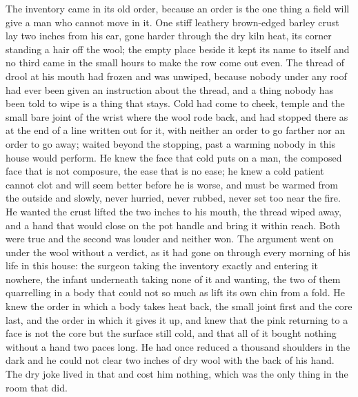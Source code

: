 The inventory came in its old order, because an order is the one thing a field will give a man who cannot move in it. One stiff leathery brown-edged barley crust lay two inches from his ear, gone harder through the dry kiln heat, its corner standing a hair off the wool; the empty place beside it kept its name to itself and no third came in the small hours to make the row come out even. The thread of drool at his mouth had frozen and was unwiped, because nobody under any roof had ever been given an instruction about the thread, and a thing nobody has been told to wipe is a thing that stays. Cold had come to cheek, temple and the small bare joint of the wrist where the wool rode back, and had stopped there as at the end of a line written out for it, with neither an order to go farther nor an order to go away;  waited beyond the stopping, past a warming nobody in this house would perform. He knew the face that cold puts on a man, the composed face that is not composure, the ease that is no ease; he knew a cold patient cannot clot and will seem better before he is worse, and must be warmed from the outside and slowly, never hurried, never rubbed, never set too near the fire. He wanted the crust lifted the two inches to his mouth, the thread wiped away, and a hand that would close on the pot handle and bring it within reach. Both were true and the second was louder and neither won. The argument went on under the wool without a verdict, as it had gone on through every morning of his life in this house: the surgeon taking the inventory exactly and entering it nowhere, the infant underneath taking none of it and wanting, the two of them quarrelling in a body that could not so much as lift its own chin from a fold. He knew the order in which a body takes heat back, the small joint first and the core last, and the order in which it gives it up, and knew that the pink returning to a face is not the core but the surface still cold, and that all of it bought nothing without a hand two paces long. He had once reduced a thousand shoulders in the dark and he could not clear two inches of dry wool with the back of his hand. The dry joke lived in that and cost him nothing, which was the only thing in the room that did.

